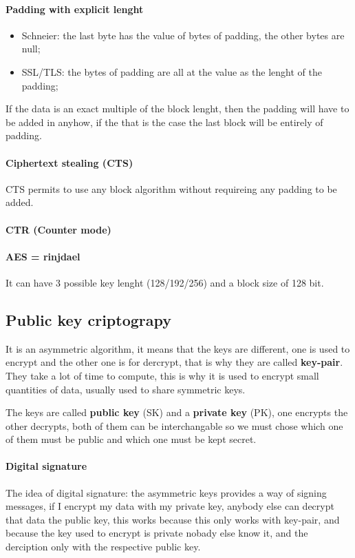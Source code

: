 \documentclass[12pt]{article}
\begin{document}
\paragraph{Padding with explicit lenght}
\begin{itemize}
    \item Schneier: the last byte has the value of bytes of padding, the other bytes are null;
    \item SSL/TLS: the bytes of padding are all at the value as the lenght of the padding;
\end{itemize}
If the data is an exact multiple of the block lenght, then the padding will have to be added in anyhow, if the that is the case the last block will be entirely of padding.

\paragraph{Ciphertext stealing (CTS)}
CTS permits to use any block algorithm without requireing any padding to be added.

\paragraph{CTR (Counter mode)}



\paragraph{AES = rinjdael}
It can have 3 possible key lenght (128/192/256) and a block size of 128 bit.


\subsection{Public key criptograpy}
It is an asymmetric algorithm, it means that the keys are different, one is used to encrypt and the other one is for dercrypt, that is why they are called \textbf{key-pair}. They take a lot of time to compute, this is why it is used to encrypt small quantities of data, usually used to share symmetric keys.

The keys are called \textbf{public key} (SK) and a \textbf{private key} (PK), one encrypts the other decrypts, both of them can be interchangable so we must chose which one of them must be public and which one must be kept secret.

\paragraph{Digital signature}
The idea of digital signature: the asymmetric keys provides a way of signing messages, if I encrypt my data with my private key, anybody else can decrypt that data the public key, this works because this only works with key-pair, and because the key used to encrypt is private nobady else know it, and the derciption only with the respective public key.
\end{document}

